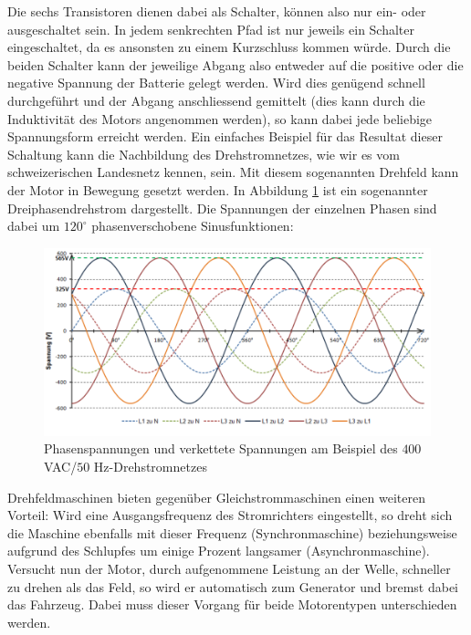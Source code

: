 Die sechs Transistoren dienen dabei als Schalter, können also nur ein- oder ausgeschaltet sein. In jedem senkrechten Pfad ist nur jeweils ein Schalter eingeschaltet, da es ansonsten zu einem Kurzschluss kommen würde. Durch die beiden Schalter kann der jeweilige Abgang also entweder auf die positive oder die negative Spannung der Batterie gelegt werden. Wird dies genügend schnell durchgeführt und der Abgang anschliessend gemittelt (dies kann durch die Induktivität des Motors angenommen werden), so kann dabei jede beliebige Spannungsform erreicht werden. Ein einfaches Beispiel für das Resultat dieser Schaltung kann die Nachbildung des Drehstromnetzes, wie wir es vom schweizerischen Landesnetz kennen, sein. Mit diesem sogenannten Drehfeld kann der Motor in Bewegung gesetzt werden. In Abbildung \ref{fig:Phasenspannungen} ist ein sogenannter Dreiphasendrehstrom dargestellt. Die Spannungen der einzelnen Phasen sind dabei um $120^\circ$ phasenverschobene Sinusfunktionen:

\begin{figure}[h]
	\centering
		\includegraphics[width=1.00\textwidth]{images/Phasenspannungen.PNG}
	\caption{Phasenspannungen und verkettete Spannungen am Beispiel des $400$ VAC/$50$ Hz-Drehstromnetzes \cite{phasen}}
	\label{fig:Phasenspannungen}
\end{figure}

Drehfeldmaschinen bieten gegenüber Gleichstrommaschinen einen weiteren Vorteil: Wird eine Ausgangsfrequenz des Stromrichters eingestellt, so dreht sich die Maschine ebenfalls mit dieser Frequenz (Synchronmaschine) beziehungsweise aufgrund des Schlupfes um einige Prozent langsamer (Asynchronmaschine). Versucht nun der Motor, durch aufgenommene Leistung an der Welle, schneller zu drehen als das Feld, so wird er automatisch zum Generator und bremst dabei das Fahrzeug. Dabei muss dieser Vorgang für beide Motorentypen unterschieden werden.

